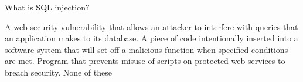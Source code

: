 


\begin{center}
\end{center}

\begin{questions}
    \question What is SQL injection?

    \begin{randomizechoices}
        \CorrectChoice A web security vulnerability that allows an attacker to interfere with queries that an application makes to its database.
        \choice A piece of code intentionally inserted into a software system that will set off a malicious function when specified conditions are met.
        \choice Program that prevents misuse of scripts on protected web services to breach security.
        \choice None of these
    \end{randomizechoices}


\end{questions}

